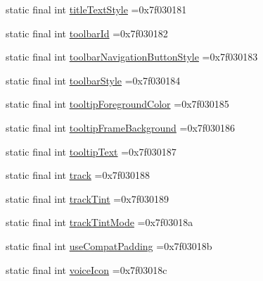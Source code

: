 \begin{DoxyCompactItemize}
\item 
static final int \mbox{\hyperlink{classbr_1_1unb_1_1cic_1_1mp_1_1marketmaster_1_1test_1_1R_1_1attr_a9abcca0c065d63f5268b82e537072a6d}{title\+Text\+Style}} =0x7f030181
\item 
static final int \mbox{\hyperlink{classbr_1_1unb_1_1cic_1_1mp_1_1marketmaster_1_1test_1_1R_1_1attr_a79bf4111df52c6af0389a99d92cf2242}{toolbar\+Id}} =0x7f030182
\item 
static final int \mbox{\hyperlink{classbr_1_1unb_1_1cic_1_1mp_1_1marketmaster_1_1test_1_1R_1_1attr_a05abeb98774081d8ce7510e0f775928a}{toolbar\+Navigation\+Button\+Style}} =0x7f030183
\item 
static final int \mbox{\hyperlink{classbr_1_1unb_1_1cic_1_1mp_1_1marketmaster_1_1test_1_1R_1_1attr_ac89abdd87f1b90e664a20e1fe534dbb2}{toolbar\+Style}} =0x7f030184
\item 
static final int \mbox{\hyperlink{classbr_1_1unb_1_1cic_1_1mp_1_1marketmaster_1_1test_1_1R_1_1attr_adc2775fa1059c08568527b3c5978bdf5}{tooltip\+Foreground\+Color}} =0x7f030185
\item 
static final int \mbox{\hyperlink{classbr_1_1unb_1_1cic_1_1mp_1_1marketmaster_1_1test_1_1R_1_1attr_adafc1f4008ada87d4f8b5f8a1fdadf70}{tooltip\+Frame\+Background}} =0x7f030186
\item 
static final int \mbox{\hyperlink{classbr_1_1unb_1_1cic_1_1mp_1_1marketmaster_1_1test_1_1R_1_1attr_a76187630c805214185bc5122da0dd1e8}{tooltip\+Text}} =0x7f030187
\item 
static final int \mbox{\hyperlink{classbr_1_1unb_1_1cic_1_1mp_1_1marketmaster_1_1test_1_1R_1_1attr_a3609096187573f877aa3db0ccca1f7f6}{track}} =0x7f030188
\item 
static final int \mbox{\hyperlink{classbr_1_1unb_1_1cic_1_1mp_1_1marketmaster_1_1test_1_1R_1_1attr_a7d55798edf015ab9223fe42d5b18f945}{track\+Tint}} =0x7f030189
\item 
static final int \mbox{\hyperlink{classbr_1_1unb_1_1cic_1_1mp_1_1marketmaster_1_1test_1_1R_1_1attr_a90a116ebeb6db13a105b92aa345779ed}{track\+Tint\+Mode}} =0x7f03018a
\item 
static final int \mbox{\hyperlink{classbr_1_1unb_1_1cic_1_1mp_1_1marketmaster_1_1test_1_1R_1_1attr_aac0e4d4b42b3a217f4f9e8aaf84734df}{use\+Compat\+Padding}} =0x7f03018b
\item 
static final int \mbox{\hyperlink{classbr_1_1unb_1_1cic_1_1mp_1_1marketmaster_1_1test_1_1R_1_1attr_a510699e9dafb68b4dc0a9053b589641d}{voice\+Icon}} =0x7f03018c
\item 

\end{DoxyCompactItemize}
